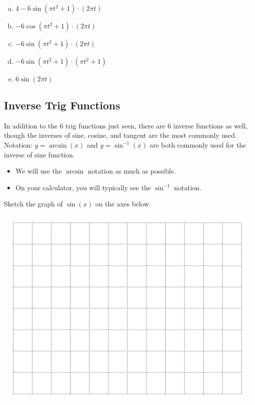 \begin{enumerate}[(a)]
\item $4 - 6 \sin(\pi t^2 + 1) \cdot (2 \pi t)$ \\[2ex]
\item $- 6 \cos(\pi t^2 + 1) \cdot (2 \pi t)$ \\[2ex]
\item $- 6 \sin(\pi t^2 + 1) \cdot (2 \pi t)$ \\[2ex]
\item $-6 \sin(\pi t^2 + 1) \cdot (\pi t^2 + 1)$ \\[2ex]
\item $6 \sin(2 \pi t)$ 
\end{enumerate}




\newpage


 \subsection*{Inverse Trig Functions}


 In addition to the 6 trig functions just seen, there are 6 inverse
 functions as well, though the inverses of sine, cosine, and tangent
 are the most commonly used. \\[2ex]

 Notation: $y = \arcsin(x)$ and $y = \sin^{-1}(x)$ are both commonly
 used for the inverse of sine function. \\[1ex]
 \begin{itemize}
 \item We will use the $\arcsin$ notation as much as possible. \\[1ex]
 \item On your calculator, you will typically see the $\sin^{-1}$
   notation.
 \end{itemize}

\newpage

 \problem Sketch the graph of $\sin(x)$ on the axes below.

 \includegraphics[width=0.5\linewidth]{graphics/empty_graph_wide_12}


